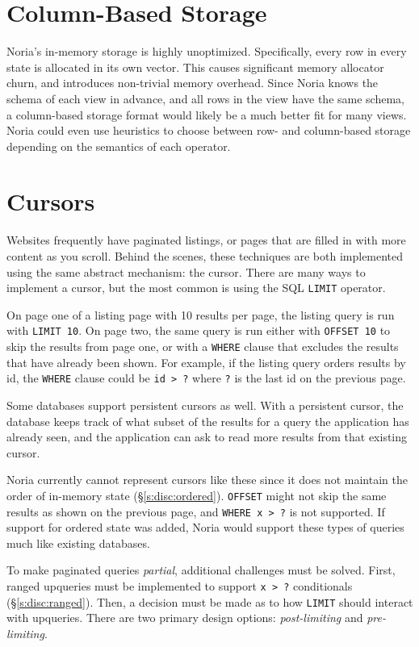 \section{Column-Based Storage}

Noria's in-memory storage is highly unoptimized. Specifically, every row in
every state is allocated in its own vector. This causes significant memory
allocator churn, and introduces non-trivial memory overhead. Since Noria knows
the schema of each view in advance, and all rows in the view have the same
schema, a column-based storage format would likely be a much better fit for
many views. Noria could even use heuristics to choose between row- and
column-based storage depending on the semantics of each operator.

\section{Cursors}

Websites frequently have paginated listings, or pages that are filled in with
more content as you scroll. Behind the scenes, these techniques are both
implemented using the same abstract mechanism: the cursor. There are many ways to
implement a cursor, but the most common is using the SQL \texttt{LIMIT}
operator.

On page one of a listing page with 10 results per page, the listing query is run
with \texttt{LIMIT 10}. On page two, the same query is run either with
\texttt{OFFSET 10} to skip the results from page one, or with a \texttt{WHERE}
clause that excludes the results that have already been shown. For example, if
the listing query orders results by id, the \texttt{WHERE} clause could be
\texttt{id > ?} where \texttt{?} is the last id on the previous page.

Some databases support persistent cursors as well. With a persistent cursor, the
database keeps track of what subset of the results for a query the application
has already seen, and the application can ask to read more results from that
existing cursor.

Noria currently cannot represent cursors like these since it does not maintain
the order of in-memory state (\S\ref{s:disc:ordered}). \texttt{OFFSET} might not
skip the same results as shown on the previous page, and \texttt{WHERE x > ?} is
not supported. If support for ordered state was added, Noria would support these
types of queries much like existing databases.

To make paginated queries \emph{partial}, additional challenges must be solved.
First, ranged upqueries must be implemented to support \texttt{x > ?}
conditionals (\S\ref{s:disc:ranged}). Then, a decision must be made as to how
\texttt{LIMIT} should interact with upqueries. There are two primary design
options: \emph{post-limiting} and \emph{pre-limiting}.

